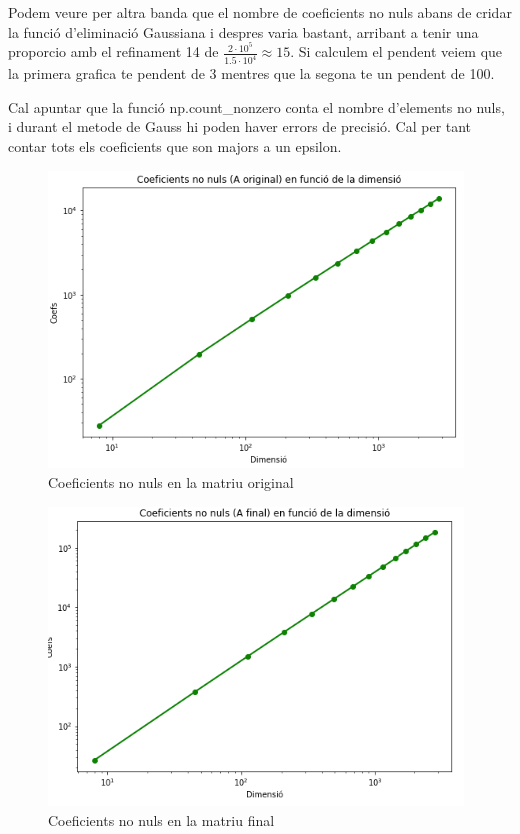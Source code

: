 \documentclass[12pt, a4papre]{article}
\begin{document}
	Podem veure per altra banda que el nombre de coeficients no nuls abans de cridar la funció d'eliminació Gaussiana i despres varia bastant, arribant a tenir una proporcio amb el refinament 14 de $\frac{2\cdot 10^5}{1.5\cdot 10^4} \approx 15$. Si calculem el pendent veiem que la primera grafica te pendent de 3 mentres que la segona te un pendent de 100. 
	
	Cal apuntar que la funció np.count\_nonzero conta el nombre d'elements no nuls, i durant el metode de Gauss hi poden haver errors de precisió. Cal per tant contar tots els coeficients que son majors a un epsilon.
	
	\begin{figure}[H]
		\begin{center}
		\includegraphics[width=110mm]{coef_dim_or.png}
		\caption{Coeficients no nuls en la matriu original}
		\end{center}
	\end{figure}
	
	\begin{figure}[H]
		\begin{center}
		\includegraphics[width=110mm]{coef_dim_fin.png}
		\caption{Coeficients no nuls en la matriu final}
		\end{center}
	\end{figure}
	
	
\end{document}
